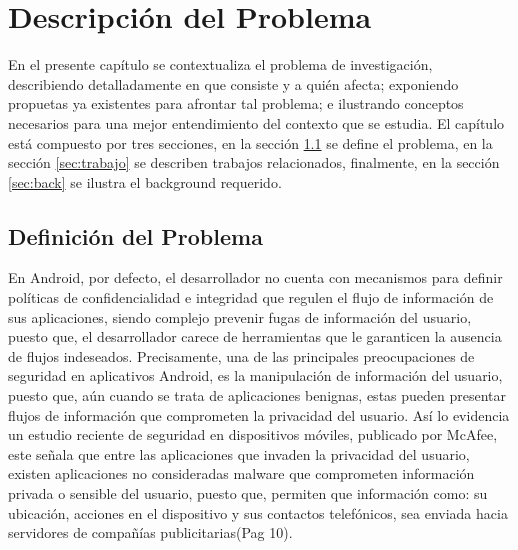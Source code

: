 \chapter{Descripción del Problema}
\label{ch:problema}
En el presente capítulo se contextualiza el problema de investigación,
describiendo detalladamente en que consiste y a quién afecta; exponiendo
propuetas ya existentes para afrontar tal problema; e ilustrando
conceptos necesarios para una mejor entendimiento del contexto que se estudia.
El capítulo está compuesto por tres secciones, en la sección
\ref{sec:definicion} se define el problema, en la sección \ref{sec:trabajo} se
describen trabajos relacionados, finalmente, en la sección \ref{sec:back} se
ilustra el background requerido.

\section{Definición del Problema}
\label{sec:definicion}
En Android, por defecto, el desarrollador no cuenta con mecanismos para definir
políticas de confidencialidad e integridad que regulen el flujo de información
de sus aplicaciones, siendo complejo prevenir fugas de información del usuario,
puesto que, el desarrollador carece de herramientas que le garanticen la
ausencia de flujos indeseados. \newline
Precisamente, una de las principales preocupaciones de seguridad en aplicativos
Android, es la manipulación de información del usuario, puesto que, aún cuando
se trata de aplicaciones benignas, estas pueden presentar flujos de información
que comprometen la privacidad del usuario. \newline
Así lo evidencia un estudio reciente de seguridad en dispositivos móviles,
publicado por McAfee\cite{McAfeeReport}, este señala que entre las aplicaciones
que invaden la privacidad del usuario, existen aplicaciones no consideradas
malware que comprometen información privada o sensible del usuario,
puesto que, permiten que información como: su ubicación,
acciones en el dispositivo y sus contactos telefónicos, sea enviada hacia
servidores de compañías publicitarias\cite{McAfeeReport}(Pag 10).\newline
% 
% 
